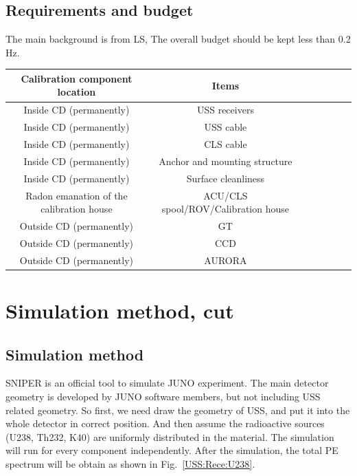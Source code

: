 \documentclass[review,number,sort&compress]{elsarticle}
\begin{document}
\subsection{Requirements and budget}

The main background is from LS, 
The overall budget should be kept less than 0.2 Hz.

\begin{center}
	\centering
	\begin{tabular*}{150mm}{@{\extracolsep{\fill}}ccccccc}
		\toprule  %
               Calibration component location & Items\\
		\midrule  %
	       Inside CD (permanently) & USS receivers\\
               Inside CD (permanently) & USS cable\\
               Inside CD (permanently) & CLS cable\\
               Inside CD (permanently) & Anchor and mounting structure\\
               Inside CD (permanently) & Surface cleanliness\\
		\midrule  %
	       Radon emanation of the calibration house & ACU/CLS spool/ROV/Calibration house\\
		\midrule  %
		Outside CD (permanently) & GT\\
		Outside CD (permanently) & CCD \\
		Outside CD (permanently) & AURORA\\
		 \bottomrule  %
\end{tabular*}
\end{center}

\section{Simulation method, cut}
\subsection{Simulation method}
SNIPER is an official tool to simulate JUNO experiment. The main detector geometry is developed by JUNO software members, but not including USS related geometry. So first, we need draw the geometry of USS, and put it into the whole detector in correct position. And then assume the radioactive sources (U238, Th232, K40) are uniformly distributed in the material. The simulation will run for every component independently. After the simulation, the total PE spectrum will be obtain as shown in Fig.~\ref{USS:Rece:U238}.
\end{document}
